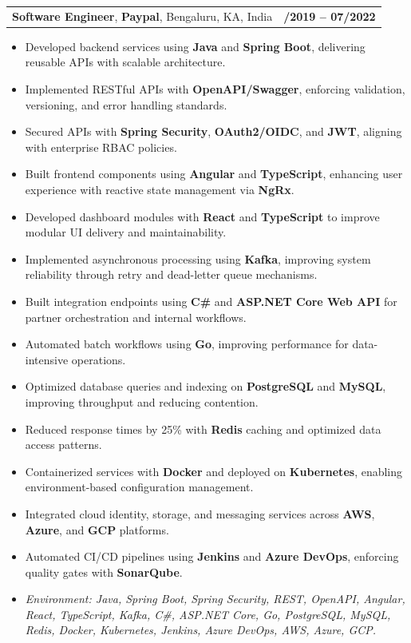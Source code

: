 \documentclass[letterpaper,11pt]{article}
\makeatletter
\newcommand{\resumeItem}[1]{
  \item\footnotesize{
    {#1 \vspace{-2pt}}
  }
}
\newcommand{\resumeSubheading}[4]{
  \vspace{-2pt}\item
    \begin{tabular*}{1.0\textwidth}[t]{l@{\extracolsep{\fill}}r}
      \textbf{\fontsize{10pt}{14pt}\selectfont #3}, \textbf{\fontsize{10pt}{14pt}\selectfont #1}, \fontsize{10pt}{14pt}\selectfont #4 & \textbf{\fontsize{10pt}{14pt}\selectfont #2} \\
    \end{tabular*}\vspace{-7pt}
}
\newcommand{\resumeItemListStart}{\begin{itemize}[leftmargin=*]}
\newcommand{\resumeItemListEnd}{\end{itemize}\vspace{-5pt}}
\makeatother
\begin{document}
\resumeSubheading
{Paypal}{08/2019 -- 07/2022}
{Software Engineer}{Bengaluru, KA, India}
\resumeItemListStart
  \resumeItem{Developed backend services using \textbf{Java} and \textbf{Spring Boot}, delivering reusable APIs with scalable architecture.}
  \resumeItem{Implemented RESTful APIs with \textbf{OpenAPI/Swagger}, enforcing validation, versioning, and error handling standards.}
  \resumeItem{Secured APIs with \textbf{Spring Security}, \textbf{OAuth2/OIDC}, and \textbf{JWT}, aligning with enterprise RBAC policies.}
  \resumeItem{Built frontend components using \textbf{Angular} and \textbf{TypeScript}, enhancing user experience with reactive state management via \textbf{NgRx}.}
  \resumeItem{Developed dashboard modules with \textbf{React} and \textbf{TypeScript} to improve modular UI delivery and maintainability.}
  \resumeItem{Implemented asynchronous processing using \textbf{Kafka}, improving system reliability through retry and dead-letter queue mechanisms.}
  \resumeItem{Built integration endpoints using \textbf{C\#} and \textbf{ASP.NET Core Web API} for partner orchestration and internal workflows.}
  \resumeItem{Automated batch workflows using \textbf{Go}, improving performance for data-intensive operations.}
  \resumeItem{Optimized database queries and indexing on \textbf{PostgreSQL} and \textbf{MySQL}, improving throughput and reducing contention.}
  \resumeItem{Reduced response times by 25\% with \textbf{Redis} caching and optimized data access patterns.}
  \resumeItem{Containerized services with \textbf{Docker} and deployed on \textbf{Kubernetes}, enabling environment-based configuration management.}
  \resumeItem{Integrated cloud identity, storage, and messaging services across \textbf{AWS}, \textbf{Azure}, and \textbf{GCP} platforms.}
  \resumeItem{Automated CI/CD pipelines using \textbf{Jenkins} and \textbf{Azure DevOps}, enforcing quality gates with \textbf{SonarQube}.}
  \resumeItem{\textit{Environment: Java, Spring Boot, Spring Security, REST, OpenAPI, Angular, React, TypeScript, Kafka, C\#, ASP.NET Core, Go, PostgreSQL, MySQL, Redis, Docker, Kubernetes, Jenkins, Azure DevOps, AWS, Azure, GCP.}}
\resumeItemListEnd
\end{document}
